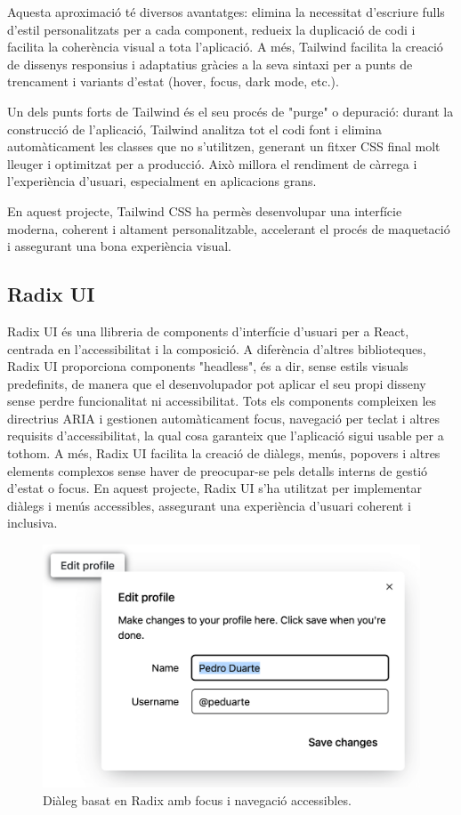 Aquesta aproximació té diversos avantatges: elimina la necessitat d'escriure fulls d'estil personalitzats per a cada component, redueix la duplicació de codi i facilita la coherència visual a tota l'aplicació. A més, Tailwind facilita la creació de dissenys responsius i adaptatius gràcies a la seva sintaxi per a punts de trencament i variants d'estat (hover, focus, dark mode, etc.).

Un dels punts forts de Tailwind és el seu procés de "purge" o depuració: durant la construcció de l'aplicació, Tailwind analitza tot el codi font i elimina automàticament les classes que no s'utilitzen, generant un fitxer CSS final molt lleuger i optimitzat per a producció. Això millora el rendiment de càrrega i l'experiència d'usuari, especialment en aplicacions grans.

En aquest projecte, Tailwind CSS ha permès desenvolupar una interfície moderna, coherent i altament personalitzable, accelerant el procés de maquetació i assegurant una bona experiència visual.

\subsection*{Radix UI}
Radix UI és una llibreria de components d'interfície d'usuari per a React, centrada en l'accessibilitat i la composició. A diferència d'altres biblioteques, Radix UI proporciona components "headless", és a dir, sense estils visuals predefinits, de manera que el desenvolupador pot aplicar el seu propi disseny sense perdre funcionalitat ni accessibilitat. Tots els components compleixen les directrius ARIA i gestionen automàticament focus, navegació per teclat i altres requisits d'accessibilitat, la qual cosa garanteix que l'aplicació sigui usable per a tothom. A més, Radix UI facilita la creació de diàlegs, menús, popovers i altres elements complexos sense haver de preocupar-se pels detalls interns de gestió d'estat o focus. En aquest projecte, Radix UI s'ha utilitzat per implementar diàlegs i menús accessibles, assegurant una experiència d'usuari coherent i inclusiva.

\begin{figure}[H]
\centering
\includegraphics[width=0.6\linewidth]{Figures/5.png}
\caption{Diàleg basat en Radix amb focus i navegació accessibles.}
\label{fig:radix-dialog}
\end{figure}

